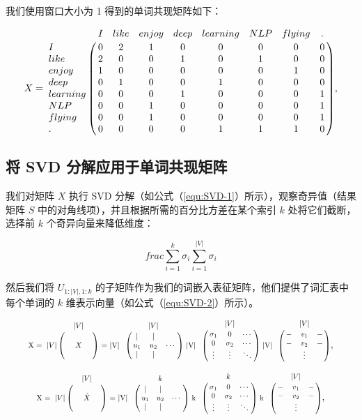 我们使用窗口大小为 1 得到的单词共现矩阵如下：

\begin{equation}
    X = \bordermatrix{
        & I & like &enjoy & deep & learning & NLP & flying & . \cr
    I    & 0 & 2 & 1 & 0 & 0 & 0 & 0 & 0 \cr
    like & 2 & 0 & 0 & 1 & 0 & 1 & 0 & 0 \cr
    enjoy & 1 & 0 & 0 & 0 & 0 & 0 & 1 & 0 \cr
    deep & 0 & 1 & 0 & 0 & 1 & 0 & 0 & 0 \cr
    learning & 0 & 0 & 0 & 1 & 0 & 0 & 0 & 1 \cr
    NLP & 0 & 0 & 1 & 0 & 0 & 0 & 0 & 1 \cr
    flying & 0 & 0 & 1 & 0 & 0 & 0 & 0 & 1 \cr
    . & 0 & 0 & 0 & 0 & 1 & 1 & 1 & 0 \cr
    },
\end{equation}

\subsection{将 SVD 分解应用于单词共现矩阵}
我们对矩阵 $X$ 执行 SVD 分解（如公式（\ref{equ:SVD-1}）所示），观察奇异值（结果矩阵 $S$ 中的对角线项），并且根据所需的百分比方差在某个索引 $k$ 处将它们截断，选择前 $k$ 个奇异向量来降低维度：

\begin{equation}
    frac{\sum_{i=1}^{k}\sigma_i}{\sum_{i=1}^{|V|}\sigma_i}
\end{equation}

然后我们将 $U_{1:|V|,1:k}$ 的子矩阵作为我们的词嵌入表征矩阵，他们提供了词汇表中每个单词的 $k$ 维表示向量（如公式（\ref{equ:SVD-2}）所示）。

\begin{equation}
    \resizebox{.9\hsize}{!}{X = \bordermatrix{
        &  & |V| &   \cr
        &  &  &      \cr
    |V| &  & X &     \cr
        &  &  &      \cr
    } = |V| \bordermatrix{
        &  & |V| &   \cr
        & | & | &   \cr
        & u_1 & u_2 & \cdots \cr
        & | & | &   \cr
    } |V| \bordermatrix{
        &  & |V| &   \cr
        & \sigma_1  & 0 & \cdots  \cr
        & 0 & \sigma_2 & \cdots \cr
        & \vdots & \vdots & \ddots  \cr
    } |V| \bordermatrix{
        &  & |V| &   \cr
        & - & v_1 & -   \cr
        & - & v_2 & - \cr
        &  & \vdots &   \cr
    }},
\label{equ:SVD-1}
\end{equation}

\begin{equation}
    \resizebox{.85\hsize}{!}{X = \bordermatrix{
        &  & |V| &   \cr
        &  &  &      \cr
    |V| &  & \hat{X} &  \cr
        &  &  &      \cr
    } = |V| \bordermatrix{
        &  & k &   \cr
        & | & | &   \cr
        & u_1 & u_2 & \cdots \cr
        & | & | &   \cr
    } k \bordermatrix{
        &  & k &   \cr
        & \sigma_1  & 0 & \cdots  \cr
        & 0 & \sigma_2 & \cdots \cr
        & \vdots & \vdots & \ddots  \cr
    } k \bordermatrix{
        &  & |V| &   \cr
        & - &v_1& -   \cr
        & - &v_2& - \cr
        &  & \vdots &   \cr
    }},
\label{equ:SVD-2}
\end{equation}

